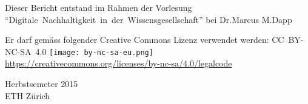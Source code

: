 \begin{titlepage}
\begin{large}
\begin{center}
			Dieser Bericht entstand im Rahmen der Vorlesung \mbox{``Digitale Nachhaltigkeit in der Wissensgesellschaft''} bei Dr.\@ Marcus M.\@ Dapp \\
			\vspace{2\baselineskip}
	
			Er darf gemäss folgender Creative Commons Lizenz verwendet werden: \mbox{CC BY-NC-SA 4.0} \texttt{[image: by-nc-sa-eu.png]}\\ \url{https://creativecommons.org/licenses/by-nc-sa/4.0/legalcode} \\
			\vfill
	
			Herbstsemeter 2015 \\
			\vspace{0.5\baselineskip}
			ETH Zürich
		\end{center}
	\end{large}
\end{titlepage}